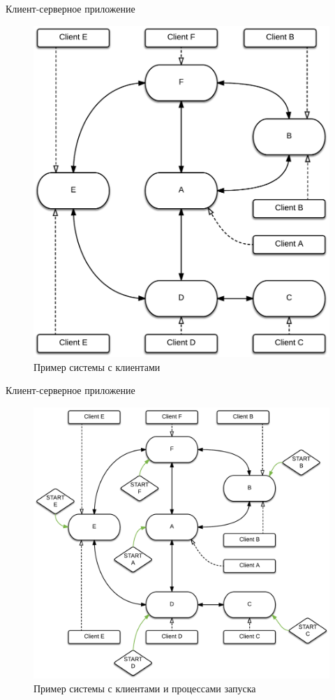 \documentclass{beamer}
\begin{document}
\begin{frame}[fragile]{Клиент-серверное приложение}
	\begin{figure}
		\includegraphics[scale=0.14]{img/client_ex.png}
		\caption{Пример системы с клиентами}
	\end{figure}
\end{frame}

\begin{frame}[fragile]{Клиент-серверное приложение}
	\begin{figure}
		\includegraphics[scale=0.11]{img/start_processes.png}
		\caption{Пример системы с клиентами и процессами запуска}
	\end{figure}
\end{frame}
\end{document}
